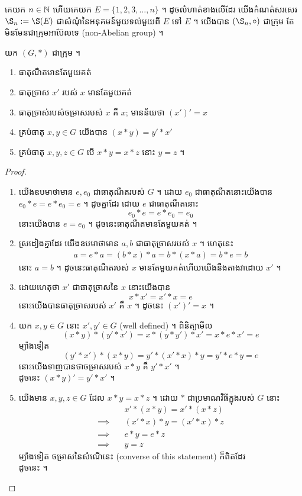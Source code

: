 \begin{corollary}
គេយក ​$n\in\mathbb{N}$ ហើយគេយក $E=\{1,2,3,\dots,n\}$ ។ ដូចលំហាត់ខាងលើដែរ យើងកំណត់សរសេរ
$\S_n:=\S(E)$ ជាសំណុំនៃអនុគមន៍មួយទល់មួយពី $E$ ទៅ $E$ ។ យើងបាន $(\S_n,\circ)$​ ជាក្រុម
តែមិនមែនជាក្រុមអាប៊ែលទេ (non-Abelian group) ។
\end{corollary}

\begin{proposition}
យក $(G,*)$ ជាក្រុម ។
\begin{enumerate}[label={(\alph*)}]
	\item ធាតុណឺតមានតែមួយគត់
	\item ធាតុច្រាស $x'$ របស់ $x$ មានតែមួយគត់
	\item ធាតុច្រាស់របស់ចម្រាសរបស់ $x$ គឺ $x$; មានន័យថា $(x')'=x$
	\item គ្រប់ធាតុ $x,y\in G$ យើងបាន $(x*y)=y'*x'$
	\item គ្រប់ធាតុ $x,y,z\in G$ បើ $x*y=x*z$ នោះ $y=z$ ។
\end{enumerate}
\end{proposition}
\begin{proof}
\text{}
\begin{enumerate}[label={(\alph*)}]
	\item យើងឧបមាថាមាន $e,e_0$ ជាធាតុណឺតរបស់ $G$ ។
	ដោយ $e_0$ ជាធាតុណឺតនោះយើងបាន $e_0*e=e*e_0=e$ ។ ដូចគ្នាដែរ ដោយ $e$ ជាធាតុណឺតនោះ
	\[e_0*e=e*e_0=e_0\]
	នោះយើងបាន $e=e_0$ ។ ដូចនេះធាតុណឺតមានតែមួយគត់ ។
	\item ស្រដៀងគ្នាដែរ យើងឧបមាថាមាន $a,b$ ជាធាតុច្រាសរបស់ $x$ ។ ហេតុនេះ
	\begin{align*}
	a=e*a=(b*x)*a=b*(x*a)=b*e=b
	\end{align*}
	នោះ $a=b$ ។ ដូចនេះធាតុណឹតរបស់ $x$ មានតែមួយគត់ហើយយើងនឹងតាងវាដោយ $x'$ ។
	\item ដោយហេតុថា $x'$ ជាធាតុច្រាសនៃ $x$ នោះយើងបាន
	\[x*x'=x'*x=e\]
	នោះយើងបានធាតុច្រាសរបស់ $x'$ គឹ $x$ ។ ដូចនេះ $\boxed{(x')'=x}$ ។
	\item យក $x,y\in G$ នោះ $x',y'\in G$ (well defined) ។ ពិនិត្យមើល
	\[(x*y)*(y'*x')=x*(y*y')*x'=x*e*x'=e\]
	ម្យ៉ាងទៀត
	\[(y'*x')*(x*y)=y'*(x'*x)*y=y'*e*y=e\]
	នោះយើងទាញបានថាចម្រាសរបស់ $x*y$ គឹ $y'*x'$ ។ \\[0.2cm]
	ដូចនេះ $\boxed{(x*y)'=y'*x'}$ ។
	\item យើងមាន $x,y,z\in G$ ដែល $x*y=x*z$ ។ ដោយ $*$ ជាប្រមាណវិធីក្នុងរបស់ $G$ នោះ
	\begin{align*}
	&x'*(x*y)=x'*(x*z)\\ \implies\quad
	&(x'*x)*y=(x'*x)*z\\ \implies\quad
	&e*y=e*z \\ \implies\quad
	&y=z
	\end{align*}
	ម្យ៉ាងទៀត ចម្រាសនៃសំណើនេះ (converse of this statement) ក៏ពិតដែរ \\[0.2cm]
	ដូចនេះ  ។
\end{enumerate}
\end{proof}













